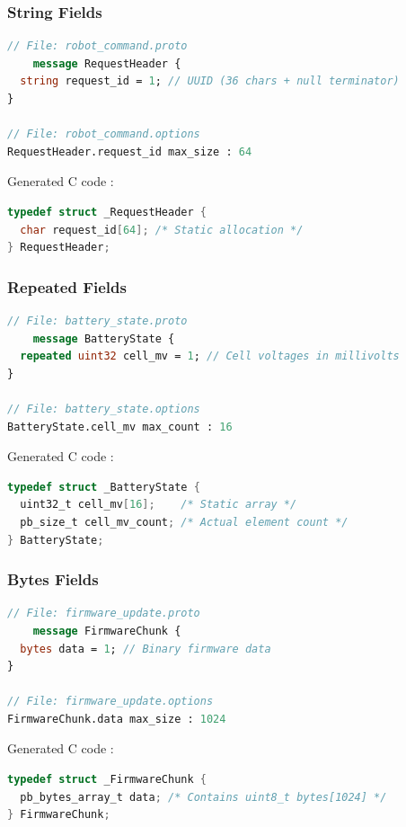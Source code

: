 \subsubsection{String Fields}

\begin{lstlisting}[language = Protobuf]
    // File: robot_command.proto
    message RequestHeader {
  string request_id = 1; // UUID (36 chars + null terminator)
}

// File: robot_command.options
RequestHeader.request_id max_size : 64
\end{lstlisting}

Generated C code :
\begin{lstlisting}[language = C]
typedef struct _RequestHeader {
  char request_id[64]; /* Static allocation */
} RequestHeader;

\end{lstlisting}
\subsubsection{Repeated Fields}

\begin{lstlisting}[language = Protobuf]
    // File: battery_state.proto
    message BatteryState {
  repeated uint32 cell_mv = 1; // Cell voltages in millivolts
}

// File: battery_state.options
BatteryState.cell_mv max_count : 16
\end{lstlisting}

Generated C code :
\begin{lstlisting}[language = C]
typedef struct _BatteryState {
  uint32_t cell_mv[16];    /* Static array */
  pb_size_t cell_mv_count; /* Actual element count */
} BatteryState;

\end{lstlisting}
\subsubsection{Bytes Fields}

\begin{lstlisting}[language = Protobuf]
    // File: firmware_update.proto
    message FirmwareChunk {
  bytes data = 1; // Binary firmware data
}

// File: firmware_update.options
FirmwareChunk.data max_size : 1024
\end{lstlisting}

Generated C code :
\begin{lstlisting}[language = C]
typedef struct _FirmwareChunk {
  pb_bytes_array_t data; /* Contains uint8_t bytes[1024] */
} FirmwareChunk;

\end{lstlisting}
